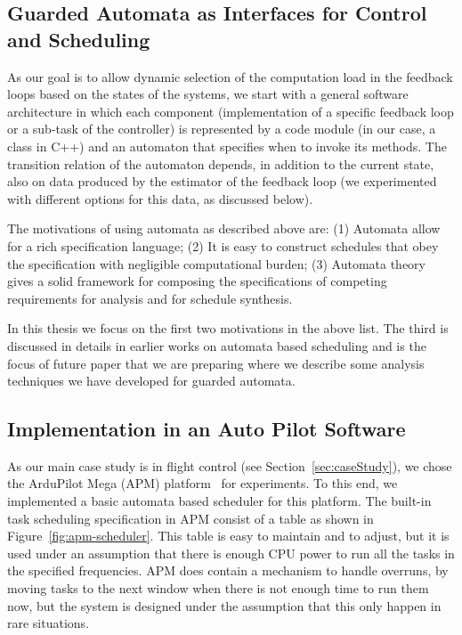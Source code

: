 \documentclass[ twoside, 12pt ]{article}
\begin{document}
\subsection{Guarded Automata as Interfaces for Control and Scheduling}
As our goal is to allow dynamic selection of the computation load in the feedback loops based on the states of the systems, we start with a general software architecture in which each component (implementation of a specific feedback loop or a sub-task of the controller) is represented by a code module (in our case, a class in C++) and an automaton that specifies when to invoke its methods. The transition relation of the automaton depends, in addition to the current state, also on data produced by the estimator of the feedback loop (we experimented with different options for this data, as discussed below).

The motivations of using automata as described above are: (1) Automata allow for a rich specification language; (2) It is easy to construct schedules that obey the specification with negligible computational burden; (3) Automata theory gives a solid framework for composing the specifications of competing requirements for analysis and for schedule synthesis. 

In this thesis we focus on the first two motivations in the above list. The third is discussed in details in earlier works on automata based scheduling and is the focus of future paper that we are preparing where we describe some analysis techniques we have developed for guarded automata.   

\subsection{Implementation in an Auto Pilot Software}
As our main case study is in flight control (see Section~\ref{sec:caseStudy}), we chose the ArduPilot Mega (APM) platform~\cite{APM} for experiments. To this end, we implemented a basic automata based scheduler for this platform. The built-in task scheduling specification in APM consist of a table as shown in Figure~\ref{fig:apm-scheduler}. This table is easy to maintain and to adjust, but it is used under an assumption that there is enough CPU power to run all the tasks in the specified frequencies. APM does contain a mechanism to handle overruns, by moving tasks to the next window when there is not enough time to run them now, but the system is designed under the assumption that this only happen in rare situations.
\end{document}
